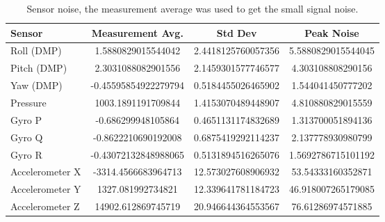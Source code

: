 \documentclass[final]{article}
\begin{document}
\begin{table}[H]
    \caption{Sensor noise, the measurement average was used to get the small signal noise.}
    \label{tab:sensor-noise}
    \centering
    \begin{tabular}{lS[table-format=4.2]S[table-format=2.2]S[table-format=1.2]}
    \toprule
    Sensor & {Measurement Avg.} & {Std Dev} & {Peak Noise} \\
    \midrule
    Roll (DMP)      & 1.5880829015544042 & 2.4418125760057356 & 5.5880829015544045 \\
    Pitch (DMP)      & 2.3031088082901556 & 2.1459301577746577 & 4.303108808290156 \\
    Yaw (DMP)      & -0.45595854922279794 & 0.5184455026465902 & 1.544041450777202 \\
    Pressure      & 1003.1891191709844 & 1.4153070489448907 & 4.810880829015559 \\
    Gyro P      & -0.686299948105864 & 0.4651131174832689 & 1.313700051894136 \\
    Gyro Q      & -0.8622210690192008 & 0.6875419292114237 & 2.137778930980799 \\
    Gyro R      & -0.43072132848988065 & 0.5131894516265076 & 1.5692786715101192 \\
    Accelerometer X      & -3314.4566683964713 & 12.573027608906932 & 53.54333160352871 \\
    Accelerometer Y      & 1327.081992734821 & 12.339641781184723 & 46.918007265179085 \\
    Accelerometer Z      & 14902.612869745719 & 20.946644364553567 & 76.61286974571885 \\
    \bottomrule
    \end{tabular}
\end{table}
\end{document}
